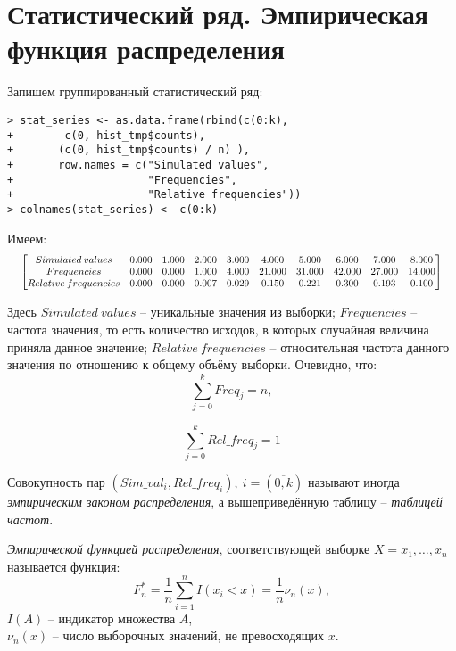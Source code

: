 \documentclass[14pt,a4paper]{scrartcl}
\begin{document}
\section{Статистический ряд. Эмпирическая функция распределения}
Запишем группированный статистический ряд:
\begin{verbatim}
> stat_series <- as.data.frame(rbind(c(0:k), 
+        c(0, hist_tmp$counts), 
+       (c(0, hist_tmp$counts) / n) ), 
+       row.names = c("Simulated values", 
+                     "Frequencies", 
+                     "Relative frequencies"))
> colnames(stat_series) <- c(0:k)
\end{verbatim}
Имеем:
\begin{equation*}
\resizebox{.98\hsize}{!}{$
	\begin{bmatrix}{}
	Simulated \: values & 0.000 & 1.000 & 2.000 & 3.000 & 4.000 & 5.000 & 6.000 & 7.000 & 8.000 \\ 
	Frequencies & 0.000 & 0.000 & 1.000 & 4.000 & 21.000 & 31.000 & 42.000 & 27.000 & 14.000 \\ 
	Relative \: frequencies & 0.000 & 0.000 & 0.007 & 0.029 & 0.150 & 0.221 & 0.300 & 0.193 & 0.100 \\ 
	\end{bmatrix}
$}
\end{equation*}

Здесь $Simulated \: values$ -- уникальные значения из выборки; $Frequencies$ -- частота значения, то есть количество исходов, в которых случайная величина приняла данное значение; $Relative \: frequencies$ -- относительная частота данного значения по отношению к общему объёму выборки. Очевидно, что:
\begin{equation*}
	\sum_{j = 0}^{k} Freq_j = n,
\end{equation*}

\begin{equation*}
	\sum_{j = 0}^{k} Rel\_freq_j = 1
\end{equation*}

Совокупность пар $(Sim\_val_i, Rel\_freq_i), \: i=(\overline{0, k})$ называют иногда \textit{эмпирическим законом распределения}, а вышеприведённую таблицу -- \textit{таблицей частот}.

\textit{Эмпирической функцией распределения}, соответствующей выборке $X = {x_1, \dots, x_n}$ называется функция:
\begin{equation*}
	F_n^* = \frac{1}{n} \sum_{i = 1}^{n} I(x_i < x) = \frac{1}{n} \nu_n(x),
\end{equation*} 
$I(A)$ -- индикатор множества $A$,\\
$\nu_n(x)$ -- число выборочных значений, не превосходящих $x$.
 
\end{document}
